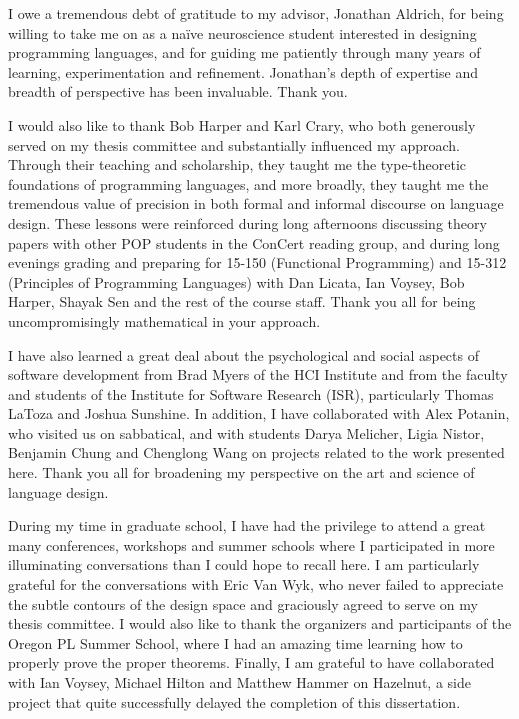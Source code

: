 \documentclass[12pt]{cmuthesis}
\begin{document}
\begin{acknowledgments}
I owe a tremendous debt of gratitude to my advisor, Jonathan Aldrich, for being willing to take me on as a na\"ive neuroscience student interested in designing programming languages, and for guiding me patiently through many years of learning, experimentation and refinement. 
Jonathan's depth of expertise and breadth of perspective has been invaluable. Thank you.%

I would also like to thank Bob Harper and Karl Crary, who both generously served on my thesis committee and substantially influenced my approach. Through their teaching and scholarship, they taught me the type-theoretic foundations of programming languages, and more broadly, they taught me the tremendous value of precision in both formal and informal discourse on language design. These lessons were reinforced during long afternoons discussing theory papers with other POP students in the ConCert reading group,  and during long evenings grading and preparing for 15-150 (Functional Programming) and 15-312 (Principles of Programming Languages) with Dan Licata, Ian Voysey, Bob Harper, Shayak Sen and the rest of the course staff. Thank you all for being uncompromisingly mathematical in your approach.

I have also learned a great deal about the psychological and social aspects of software development from Brad Myers of the HCI Institute and from the faculty and students of the Institute for Software Research (ISR), particularly Thomas LaToza and Joshua Sunshine. In addition, I have collaborated with Alex Potanin, who visited us on sabbatical, and with students Darya Melicher, Ligia Nistor, Benjamin Chung and Chenglong Wang on projects related to the work presented here. Thank you all for broadening my perspective on the art and science of language design.

During my time in graduate school, I have had the privilege to attend a great many  conferences, workshops and summer schools where I participated in more illuminating conversations than I could  hope to recall here. I am particularly grateful for the conversations with Eric Van Wyk, who never failed to appreciate the subtle contours of the design space and graciously agreed to serve on my thesis committee. I would also like to thank the organizers and participants of the Oregon PL Summer School, where I had an amazing time learning how to properly prove the proper theorems. Finally, I am grateful to have collaborated with Ian Voysey, Michael Hilton and Matthew Hammer on Hazelnut, a side project that quite successfully delayed the completion of this dissertation.


\end{acknowledgments}
\end{document}
